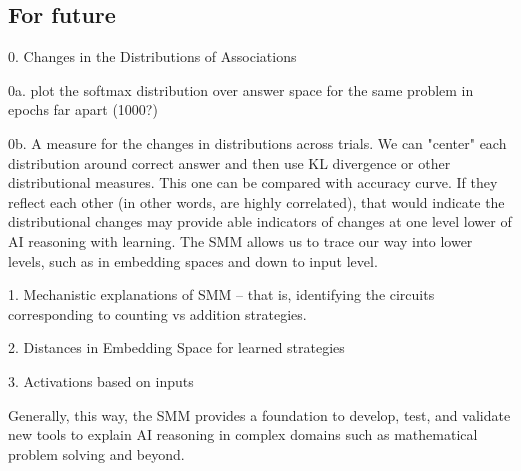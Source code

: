\documentclass{article}
\begin{document}
\subsection{For future}

0. Changes in the Distributions of Associations

0a. plot the softmax distribution over answer space for the same problem in epochs far apart (1000?)

0b. A measure for the changes in distributions across trials. We can "center" each distribution around correct answer and then use KL divergence or other distributional measures. This one can be compared with accuracy curve. If they reflect each other (in other words, are highly correlated), that would indicate the distributional changes may provide able indicators of changes at one level lower of AI reasoning with learning. The SMM allows us to trace our way into lower levels, such as in embedding spaces and down to input level.


1. Mechanistic explanations of SMM -- that is, identifying the circuits corresponding to counting vs addition strategies.

2. Distances in Embedding Space for learned strategies

3. Activations based on inputs

Generally, this way, the SMM provides a foundation to develop, test, and validate new tools to explain AI reasoning in complex domains such as mathematical problem solving and beyond.



\end{document}
